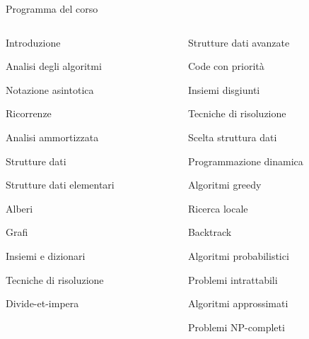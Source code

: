 \begin{frame}{Programma del corso}

\small
\vspace{-18pt}
\begin{columns}[T]
\begin{column}{0.48\textwidth}
\begin{myboxtitle}[Modulo 1]
\BIL
\item Introduzione
	\BI
	\item Analisi degli algoritmi
	\item Notazione asintotica
	\item Ricorrenze
	\item Analisi ammortizzata
	\EI
\item Strutture dati
	\BI
	\item Strutture dati elementari
	\item Alberi
	\item Grafi
	\item Insiemi e dizionari
	\EI
\item Tecniche di risoluzione
	\BI
	\item Divide-et-impera 
  \EI
\EIL
\end{myboxtitle}
\end{column}
\begin{column}{0.52\textwidth}
\begin{myboxtitle}[Modulo 2]
\BIL
\item Strutture dati avanzate
  \BI
  \item Code con priorità 
  \item Insiemi disgiunti 
  \EI
\item Tecniche di risoluzione
  \BI
	\item Scelta struttura dati 
	\item Programmazione dinamica 
	\item Algoritmi greedy
	\item Ricerca locale 
	\item Backtrack
	\item Algoritmi probabilistici
	\EI
\item Problemi intrattabili
	\BI
  \item Algoritmi approssimati
	\item Problemi NP-completi
	\EI
\EIL
\end{myboxtitle}
\end{column}
\end{columns}

\end{frame}


